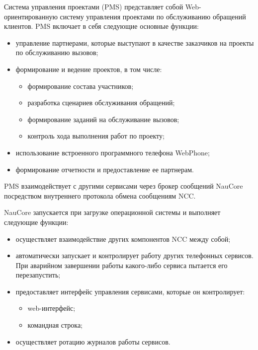 Система управления проектами (PMS) представляет собой Web-ориентированную систему
управления проектами по обслуживанию обращений клиентов.
PMS включает в себя следующие основные функции:
\begin{itemize}
    \item управление партнерами, которые выступают в качестве заказчиков на проекты по обслуживанию вызовов;
    \item формирование и ведение проектов, в том числе:
        \begin{itemize}
            \item формирование состава участников;
            \item разработка сценариев обслуживания обращений;
            \item формирование заданий на обслуживание вызовов;
            \item контроль хода выполнения работ по проекту;
        \end{itemize}
    \item использование встроенного программного телефона WebPhone;
    \item формирование отчетности и предоставление ее партнерам.
\end{itemize}

PMS взаимодействует с другими сервисами через брокер сообщений NauCore посредством внутреннего протокола обмена сообщениям NCC.

NauCore запускается при загрузке операционной системы и выполняет следующие функции:
\begin{itemize}
    \item осуществляет взаимодействие других компонентов NCC между собой;
    \item автоматически запускает и контролирует работу других телефонных сервисов. При аварийном завершении работы какого-либо сервиса пытается его перезапустить;
    \item предоставляет интерфейс управления сервисами, которые он контролирует:
        \begin{itemize}
            \item web-интерфейс;
            \item командная строка;
        \end{itemize}
    \item осуществляет ротацию журналов работы сервисов.
\end{itemize}

